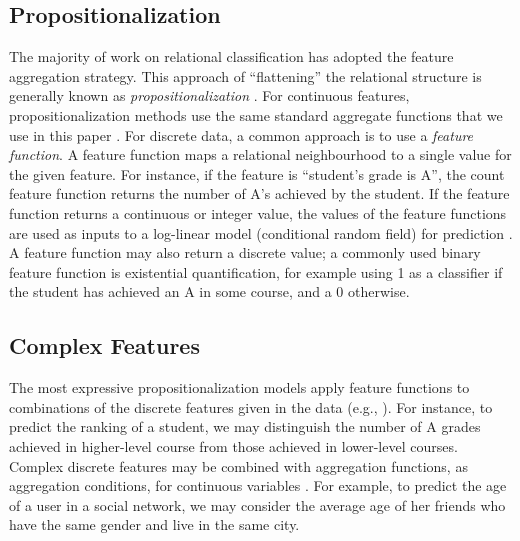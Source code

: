 \documentclass[conference]{IEEEtran}
\begin{document}
\subsection{Propositionalization} The majority of work on relational classification has adopted the feature aggregation strategy.
This approach of ``flattening'' the relational structure is generally known as {\em propositionalization} \cite{Kramer2000}. %
%
For continuous features, propositionalization methods use the same standard aggregate functions that we use in this paper \cite{Krogel2002,C.Vens2004}. For discrete data, a common approach is to use a {\em feature function}. A feature function maps a relational neighbourhood to a single value for the given feature. For instance, if the feature is ``student's grade is A'', the count feature function returns the number of A's achieved by the student. If the feature function returns a continuous or integer value, the values of the feature functions are used as inputs to a log-linear model (conditional random field) for prediction \cite{Sutton2007,Taskar2002,Domingos2009,Lu2003}. A feature function may also return a discrete value; a commonly used binary feature function is existential quantification, for example using 1 as a classifier if the student has achieved an A in some course, and a 0 otherwise.

\subsection{Complex Features} The most expressive propositionalization models apply feature functions to combinations of the discrete features given in the data (e.g., \cite{Kuzelka2011}). For instance, to predict the ranking of a student, we may distinguish the number of A grades achieved in higher-level course from those achieved in lower-level courses. Complex discrete features may be combined with aggregation functions, as aggregation conditions, for continuous variables  \cite{C.Vens2004,Popescul2007}. For example, to predict the age of a user in a social network, we may consider the average age of her friends who have the same gender and live in the same city.
\end{document}
